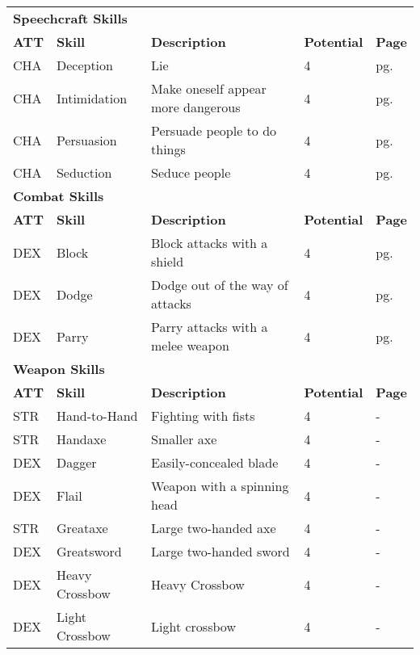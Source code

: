 \begin{multicols*}{2}
\begin{table*}[ht]
\begin{tabularx}{\textwidth}{l l X l l}
            \multicolumn{5}{l}{\bfseries{Speechcraft Skills}} \\
            \bfseries{ATT} & \bfseries{Skill} & \bfseries{Description} & \bfseries{Potential} & \bfseries{Page} \\
            CHA & Deception & Lie & 4 & pg. \pageref{skill:deception} \\
            CHA & Intimidation & Make oneself appear more dangerous & 4 & pg. \pageref{skill:intimidation} \\
            CHA & Persuasion & Persuade people to do things & 4 & pg. \pageref{skill:persuasion} \\
            CHA & Seduction & Seduce people & 4 & pg. \pageref{skill:seduction} \\
            \multicolumn{5}{l}{\bfseries{Combat Skills}} \\
            \bfseries{ATT} & \bfseries{Skill} & \bfseries{Description} & \bfseries{Potential} & \bfseries{Page} \\
            DEX & Block & Block attacks with a shield & 4 & pg. \pageref{skill:block} \\
            DEX & Dodge & Dodge out of the way of attacks & 4 & pg. \pageref{skill:dodge} \\
            DEX & Parry & Parry attacks with a melee weapon & 4 & pg. \pageref{skill:parry} \\
            \multicolumn{5}{l}{\bfseries{Weapon Skills}} \\
            \bfseries{ATT} & \bfseries{Skill} & \bfseries{Description} & \bfseries{Potential} & \bfseries{Page} \\
            STR & Hand-to-Hand & Fighting with fists & 4 & - \\
            STR & Handaxe & Smaller axe & 4 & - \\
            DEX & Dagger & Easily-concealed blade & 4 & - \\
            DEX & Flail & Weapon with a spinning head & 4 & - \\ %
            STR & Greataxe & Large two-handed axe & 4 & - \\
            DEX & Greatsword & Large two-handed sword & 4 & - \\ %
            DEX & Heavy Crossbow & Heavy Crossbow & 4 & - \\
            DEX & Light Crossbow & Light crossbow & 4 & - \\

\end{tabularx}
\end{table*}
\end{multicols*}
